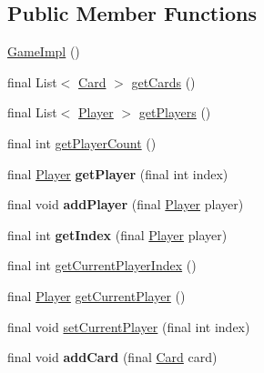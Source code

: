 \subsection*{\-Public \-Member \-Functions}
\begin{DoxyCompactItemize}
\item 
\hyperlink{classdominion_1_1model_1_1GameImpl_a9d76c72b5ad7c40523c248709e64aeba}{\-Game\-Impl} ()
\item 
final \-List$<$ \hyperlink{interfacedominion_1_1model_1_1cards_1_1Card}{\-Card} $>$ \hyperlink{classdominion_1_1model_1_1GameImpl_a58d9e3287f5916ad9394cd7fa2a94553}{get\-Cards} ()
\item 
final \-List$<$ \hyperlink{interfacedominion_1_1model_1_1Player}{\-Player} $>$ \hyperlink{classdominion_1_1model_1_1GameImpl_aa4f8d1f3a8b6b5105ac5e116c7e07bc2}{get\-Players} ()
\item 
final int \hyperlink{classdominion_1_1model_1_1GameImpl_abc80fba5f5fd4db66e5a13dd6b9be8d9}{get\-Player\-Count} ()
\item 
\hypertarget{classdominion_1_1model_1_1GameImpl_a048530cebac06b56f4b0de8bc50218ef}{final \hyperlink{interfacedominion_1_1model_1_1Player}{\-Player} {\bfseries get\-Player} (final int index)}\label{classdominion_1_1model_1_1GameImpl_a048530cebac06b56f4b0de8bc50218ef}

\item 
\hypertarget{classdominion_1_1model_1_1GameImpl_a0be1a6c433b4f54b019eb1bc09d118d4}{final void {\bfseries add\-Player} (final \hyperlink{interfacedominion_1_1model_1_1Player}{\-Player} player)}\label{classdominion_1_1model_1_1GameImpl_a0be1a6c433b4f54b019eb1bc09d118d4}

\item 
\hypertarget{classdominion_1_1model_1_1GameImpl_ac9c7b697549a4739fd9489f850edb8d7}{final int {\bfseries get\-Index} (final \hyperlink{interfacedominion_1_1model_1_1Player}{\-Player} player)}\label{classdominion_1_1model_1_1GameImpl_ac9c7b697549a4739fd9489f850edb8d7}

\item 
final int \hyperlink{classdominion_1_1model_1_1GameImpl_a531f1a8ff7b1823f80f7276268519194}{get\-Current\-Player\-Index} ()
\item 
final \hyperlink{interfacedominion_1_1model_1_1Player}{\-Player} \hyperlink{classdominion_1_1model_1_1GameImpl_ab260680f1cce00a1499b81298eaac81c}{get\-Current\-Player} ()
\item 
final void \hyperlink{classdominion_1_1model_1_1GameImpl_a54e645cb37bd4a083462a0e20068bae8}{set\-Current\-Player} (final int index)
\item 
\hypertarget{classdominion_1_1model_1_1GameImpl_aedd1a7d0065fa624d7b1eb009570b722}{final void {\bfseries add\-Card} (final \hyperlink{interfacedominion_1_1model_1_1cards_1_1Card}{\-Card} card)}\label{classdominion_1_1model_1_1GameImpl_aedd1a7d0065fa624d7b1eb009570b722}


\end{DoxyCompactItemize}
